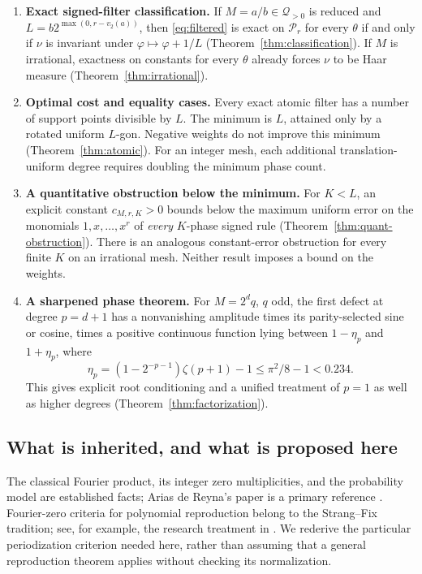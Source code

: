 \documentclass[11pt,a4paper]{article}
\numberwithin{equation}{section}
\theoremstyle{definition}
\theoremstyle{remark}
\newcommand{\Pol}{\mathcal P}\newcommand{\norm}[1]{\left\lVert#1\right\rVert}
\newcommand{\Q}{\mathcal Q}\newcommand{\Def}{\mathcal D}
\begin{document}
\begin{enumerate}[leftmargin=*,label=\textbf{\arabic*.},itemsep=4pt]
\item \textbf{Exact signed-filter classification.}
If $M=a/b\in\Q_{>0}$ is reduced and
$L=b2^{\max(0,r-v_2(a))}$, then \eqref{eq:filtered} is exact on
$\Pol_r$ for every $\theta$ if and only if $\nu$ is invariant under
$\varphi\mapsto\varphi+1/L$ (Theorem~\ref{thm:classification}).
If $M$ is irrational, exactness on constants for every $\theta$ already forces
$\nu$ to be Haar measure (Theorem~\ref{thm:irrational}).
\item \textbf{Optimal cost and equality cases.}
Every exact atomic filter has a number of support points divisible by $L$.
The minimum is $L$, attained only by a rotated uniform $L$-gon.
Negative weights do not improve this minimum
(Theorem~\ref{thm:atomic}). For an integer mesh, each additional
translation-uniform degree requires doubling the minimum phase count.
\item \textbf{A quantitative obstruction below the minimum.}
For $K<L$, an explicit constant $c_{M,r,K}>0$ bounds below the
maximum uniform error on the monomials $1,x,\ldots,x^r$ of \emph{every}
$K$-phase signed rule (Theorem~\ref{thm:quant-obstruction}).
There is an analogous constant-error obstruction for every finite $K$ on
an irrational mesh. Neither result imposes a bound on the weights.
\item \textbf{A sharpened phase theorem.}
For $M=2^dq$, $q$ odd, the first defect at degree $p=d+1$ has a
nonvanishing amplitude times its parity-selected sine or cosine, times
a positive continuous function lying between $1-\eta_p$ and $1+\eta_p$,
where
\[
 \eta_p=(1-2^{-p-1})\zeta(p+1)-1\le\pi^2/8-1<0.234.
\]
This gives explicit root conditioning and a unified treatment of $p=1$
as well as higher degrees (Theorem~\ref{thm:factorization}).
\end{enumerate}

\subsection{What is inherited, and what is proposed here}

The classical Fourier product, its integer zero multiplicities, and the
probability model are established facts; Arias de Reyna's paper is a primary
reference \cite{arias}. Fourier-zero criteria for polynomial reproduction
belong to the Strang--Fix tradition; see, for example, the research treatment
in \cite{zakharov}. We rederive the particular periodization criterion needed
here, rather than assuming that a general reproduction theorem applies
without checking its normalization.
\end{document}
